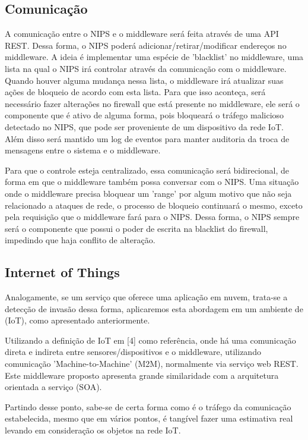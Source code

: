 \documentclass[journal]{IEEEtran}
\begin{document}
\subsection{Comunicação}
A comunicação entre o NIPS e o middleware será feita através de uma API REST. Dessa forma, o NIPS poderá adicionar/retirar/modificar endereços no middleware. A ideia é implementar uma espécie de 'blacklist' no middleware, uma lista na qual o NIPS irá controlar através da comunicação com o middleware. Quando houver alguma mudança nessa lista, o middleware irá atualizar suas ações de bloqueio de acordo com esta lista. Para que isso aconteça, será necessário fazer alterações no firewall que está presente no middleware, ele será o componente que é ativo de alguma forma, pois bloqueará o tráfego malicioso detectado no NIPS, que pode ser proveniente de um dispositivo da rede IoT. Além disso será mantido um log de eventos para manter auditoria da troca de mensagens entre o sistema e o middleware. \par
Para que o controle esteja centralizado, essa comunicação será bidirecional, de forma em que o middleware também possa conversar com o NIPS. Uma situação onde o middleware precisa bloquear um 'range' por algum motivo que não seja relacionado a ataques de rede, o processo de bloqueio continuará o mesmo, exceto pela requisição que o middleware fará para o NIPS. Dessa forma, o NIPS sempre será o componente que possui o poder de escrita na blacklist do firewall, impedindo que haja conflito de alteração.

\subsection{Internet of Things}
Analogamente, se um serviço que oferece uma aplicação em nuvem, trata-se a detecção de invasão dessa forma, aplicaremos esta abordagem em um ambiente de (IoT), como apresentado anteriormente. \par

Utilizando a definição de IoT em [4] como referência, onde há uma comunicação direta e indireta entre sensores/dispositivos e o middleware, utilizando comunicação 'Machine-to-Machine' (M2M), normalmente via serviço web REST. Este middleware proposto apresenta grande similaridade com a arquitetura orientada a serviço (SOA). \par

Partindo desse ponto, sabe-se de certa forma como é o tráfego da comunicação estabelecida, mesmo que em vários pontos, é tangível fazer uma estimativa real levando em consideração os objetos na rede IoT. \par
\end{document}
